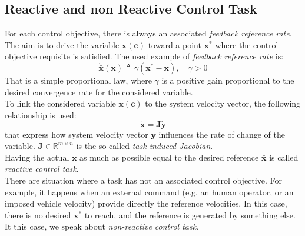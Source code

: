 \subsection{Reactive and non Reactive Control Task}
\label{sec:reactNonReact}
For each control objective, there is always an associated \textit{feedback reference rate}. The aim is to drive the variable $\boldsymbol{x}(\boldsymbol{c})$ toward a point $ \boldsymbol{x}^* $ where the control objective requisite is satisfied. The used example of \textit{feedback reference rate} is:
\begin{equation}
	\boldsymbol{\dot{\bar{x}}}(\boldsymbol{x}) \triangleq \gamma (\boldsymbol{x}^* - \boldsymbol{x}),\quad \gamma > 0
\end{equation}
That is a simple proportional law, where $\gamma$ is a positive gain proportional to the desired convergence rate for the considered variable.\\

To link the considered variable $ \boldsymbol{x}(\boldsymbol{c})$ to the system velocity vector, the following relationship is used:
\begin{equation}
\label{eq:CartJacVel}
	\boldsymbol{\dot{x}} = \boldsymbol{J} \boldsymbol{\dot{y}}
\end{equation} 
that express how system velocity vector $\boldsymbol{\dot{y}}$ influences the rate of change of the variable. $ \boldsymbol{J} \in \mathbb{R}^{m \times n}$ is the so-called \textit{task-induced Jacobian}.\\
Having the actual $\boldsymbol{\dot{x}}$ as much as possible equal to the desired reference $\boldsymbol{\bar{x}}$ is called \textit{reactive control task}.\\

There are situation where a task has not an associated control objective. For example, it happens when an external command (e.g. an human operator, or an imposed vehicle velocity) provide directly the reference velocities. In this case, there is no desired $\boldsymbol{x}^*$ to reach, and the reference is generated by something else. It this case, we speak about \textit{non-reactive control task}.


